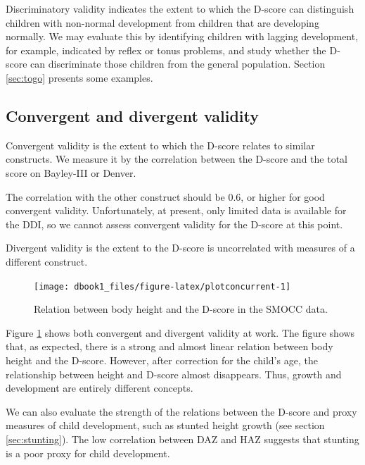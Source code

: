 \documentclass[
]{book}
\begin{document}
Discriminatory validity indicates the extent to which the D-score can distinguish children with non-normal development from children that are developing normally. We may evaluate this by identifying children with lagging development, for example, indicated by reflex or tonus problems, and study whether the D-score can discriminate those children from the general population. Section \ref{sec:togo} presents some examples.

\hypertarget{convergent-and-divergent-validity}{%
\subsection{Convergent and divergent validity}\label{convergent-and-divergent-validity}}

Convergent validity is the extent to which the D-score relates to similar constructs. We measure it by the correlation between the D-score and the total score on Bayley-III or Denver.

The correlation with the other construct should be 0.6, or higher for good convergent validity. Unfortunately, at present, only limited data is available for the DDI, so we cannot assess convergent validity for the D-score at this point.

Divergent validity is the extent to the D-score is uncorrelated with measures of a different construct.

\begin{figure}

{\centering \texttt{[image: dbook1\_files/figure-latex/plotconcurrent-1]} 

}

\caption{Relation between body height and the D-score in the SMOCC data.}\label{fig:plotconcurrent}
\end{figure}



Figure \ref{fig:plotconcurrent} shows both convergent and divergent validity at work. The figure shows that, as expected, there is a strong and almost linear relation between body height and the D-score. However, after correction for the child's age, the relationship between height and D-score almost disappears. Thus, growth and development are entirely different concepts.

We can also evaluate the strength of the relations between the D-score and proxy measures of child development, such as stunted height growth (see section \ref{sec:stunting}). The low correlation between DAZ and HAZ suggests that stunting is a poor proxy for child development.
\end{document}
